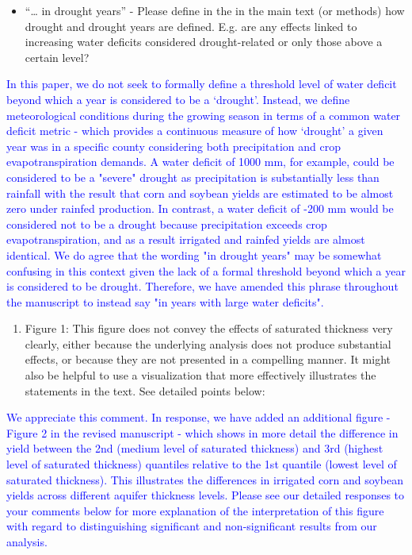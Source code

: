 \documentclass[
]{article}
\providecommand{\tightlist}{%
  \setlength{\itemsep}{0pt}\setlength{\parskip}{0pt}}
\begin{document}
\begin{itemize}
\tightlist
\item
  ``\ldots{} in drought years'' - Please define in the in the main text
  (or methods) how drought and drought years are defined. E.g. are any
  effects linked to increasing water deficits considered drought-related
  or only those above a certain level?
\end{itemize}

\textcolor{blue}{In this paper, we do not seek to formally define a threshold level of water deficit beyond which a year is considered to be a `drought'. Instead, we define meteorological conditions during the growing season in terms of a common water deficit metric - which provides a continuous measure of how `drought' a given year was in a specific county considering both precipitation and crop evapotranspiration demands. A water deficit of 1000 mm, for example, could be considered to be a "severe" drought as precipitation is substantially less than rainfall with the result that corn and soybean yields are estimated to be almost zero under rainfed production. In contrast, a water deficit of -200 mm would be considered not to be a drought because precipitation exceeds crop evapotranspiration, and as a result irrigated and rainfed yields are almost identical. We do agree that the wording "in drought years" may be somewhat confusing in this context given the lack of a formal threshold beyond which a year is considered to be drought. Therefore, we have amended this phrase throughout the manuscript to instead say "in years with large water deficits".}

\begin{enumerate}
\def\labelenumi{\arabic{enumi}.}
\tightlist
\item
  Figure 1: This figure does not convey the effects of saturated
  thickness very clearly, either because the underlying analysis does
  not produce substantial effects, or because they are not presented in
  a compelling manner. It might also be helpful to use a visualization
  that more effectively illustrates the statements in the text. See
  detailed points below:
\end{enumerate}

\textcolor{blue}{We appreciate this comment. In response, we have added an additional figure - Figure 2 in the revised manuscript - which shows in more detail the difference in yield between the 2nd (medium level of saturated thickness) and 3rd (highest level of saturated thickness) quantiles relative to the 1st quantile (lowest level of saturated thickness). This illustrates the differences in irrigated corn and soybean yields across different aquifer thickness levels. Please see our detailed responses to your comments below for more explanation of the interpretation of this figure with regard to distinguishing significant and non-significant results from our analysis.}
\end{document}
